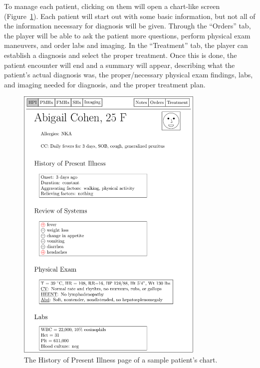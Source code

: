 \documentclass[12pt, twoside]{article}
\begin{document}
	To manage each patient, clicking on them will open a chart-like screen (Figure~\ref{fig:chartmain}). Each patient will start out with some basic information, but not all of the information necessary for diagnosis will be given. Through the ``Orders'' tab, the player will be able to ask the patient more questions, perform physical exam maneuvers, and order labs and imaging. In the ``Treatment'' tab, the player can establish a diagnosis and select the proper treatment. Once this is done, the patient encounter will end and a summary will appear, describing what the patient's actual diagnosis was, the proper/necessary physical exam findings, labs, and imaging needed for diagnosis, and the proper treatment plan.

	\begin{figure}[h]
		\centering
		\includegraphics[width=0.8\textwidth]{../Figures/ChartMain/ChartMain.pdf}
		\caption{The History of Present Illness page of a sample patient's chart.}
		\label{fig:chartmain}
	\end{figure}
\end{document}
